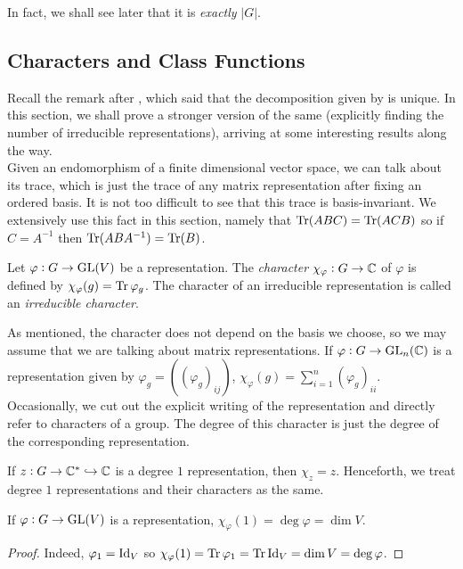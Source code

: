 		In fact, we shall see later that it is \emph{exactly} $|G|$.

	\subsection{Characters and Class Functions}

		Recall the remark after , which said that the decomposition given by  is unique. In this section, we shall prove a stronger version of the same (explicitly finding the number of irreducible representations), arriving at some interesting results along the way.\\
		Given an endomorphism of a finite dimensional vector space, we can talk about its trace, which is just the trace of any matrix representation after fixing an ordered basis. It is not too difficult to see that this trace is basis-invariant. We extensively use this fact in this section, namely that $\operatorname{Tr}(ABC) = \operatorname{Tr}(ACB)$ so if $C = A^{-1}$ then $\operatorname{Tr}(ABA^{-1}) = \operatorname{Tr}(B)$.

		\begin{fdef}[Character]
			Let $\varphi : G \to \operatorname{GL}(V)$ be a representation. The \emph{character} $\chi_\varphi : G \to \mathbb{C}$ of $\varphi$ is defined by $\chi_{\varphi}(g) = \operatorname{Tr} \varphi_g$. The character of an irreducible representation is called an \emph{irreducible character}.
		\end{fdef}

		As mentioned, the character does not depend on the basis we choose, so we may assume that we are talking about matrix representations. If $\varphi : G \to \operatorname{GL}_n(\mathbb{C})$ is a representation given by $\varphi_g = ((\varphi_g)_{ij})$, $\chi_\varphi(g) = \sum_{i=1}^n (\varphi_g)_{ii}$.\\

		Occasionally, we cut out the explicit writing of the representation and directly refer to characters of a group. The degree of this character is just the degree of the corresponding representation.

		\begin{remark}
			If $z : G \to \mathbb{C}^* \hookrightarrow \mathbb{C}$ is a degree $1$ representation, then $\chi_z = z$. Henceforth, we treat degree $1$ representations and their characters as the same.
		\end{remark}

		\begin{prop}
			\label{prop: character of 1}
			If $\varphi : G \to \operatorname{GL}(V)$ is a representation, $\chi_\varphi(1) = \deg \varphi = \dim V$.
		\end{prop}
		\begin{proof}
			Indeed, $\varphi_1 = \operatorname{Id}_V$ so $\chi_\varphi(1) = \operatorname{Tr} \varphi_1 = \operatorname{Tr} \operatorname{Id}_V = \dim V = \deg \varphi$.
		\end{proof}

